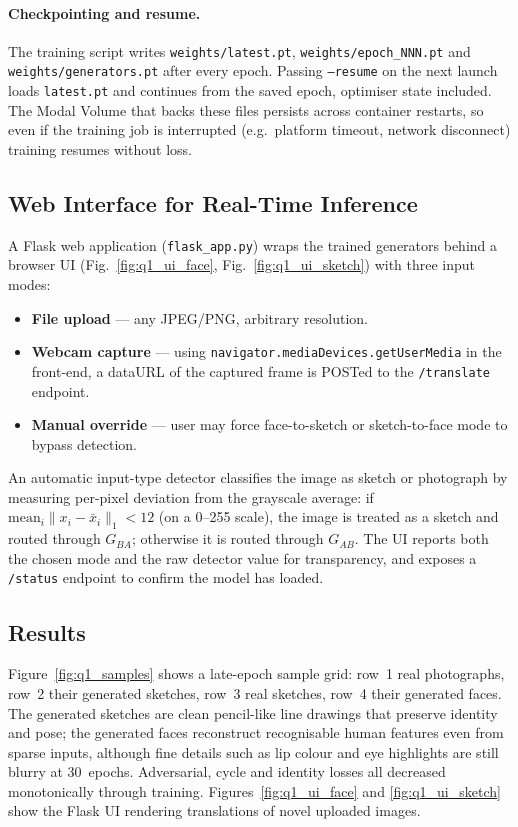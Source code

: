 \documentclass[runningheads]{llncs}
\begin{document}
\paragraph{Checkpointing and resume.} The training script writes
\texttt{weights/latest.pt}, \texttt{weights/epoch\_NNN.pt} and
\texttt{weights/generators.pt} after every epoch. Passing
\texttt{--resume} on the next launch loads \texttt{latest.pt} and
continues from the saved epoch, optimiser state included. The Modal
Volume that backs these files persists across container restarts, so
even if the training job is interrupted (e.g.\ platform timeout,
network disconnect) training resumes without loss.

\subsection{Web Interface for Real-Time Inference}

A Flask web application (\texttt{flask\_app.py}) wraps the trained
generators behind a browser UI (Fig.~\ref{fig:q1_ui_face},
Fig.~\ref{fig:q1_ui_sketch}) with three input modes:

\begin{itemize}
\item \textbf{File upload} --- any JPEG/PNG, arbitrary resolution.
\item \textbf{Webcam capture} --- using
\texttt{navigator.mediaDevices.getUserMedia} in the front-end, a
dataURL of the captured frame is POSTed to the \texttt{/translate}
endpoint.
\item \textbf{Manual override} --- user may force face-to-sketch or
sketch-to-face mode to bypass detection.
\end{itemize}

An automatic input-type detector classifies the image as sketch or
photograph by measuring per-pixel deviation from the grayscale average:
if $\mathrm{mean}_{i}\lVert x_i - \bar{x}_i \rVert_1 < 12$ (on a 0--255
scale), the image is treated as a sketch and routed through $G_{BA}$;
otherwise it is routed through $G_{AB}$. The UI reports both the
chosen mode and the raw detector value for transparency, and exposes a
\texttt{/status} endpoint to confirm the model has loaded.

\subsection{Results}

Figure~\ref{fig:q1_samples} shows a late-epoch sample grid: row~1 real
photographs, row~2 their generated sketches, row~3 real sketches, row~4
their generated faces. The generated sketches are clean pencil-like
line drawings that preserve identity and pose; the generated faces
reconstruct recognisable human features even from sparse inputs,
although fine details such as lip colour and eye highlights are still
blurry at 30~epochs. Adversarial, cycle and identity losses all decreased
monotonically through training. Figures~\ref{fig:q1_ui_face} and
\ref{fig:q1_ui_sketch} show the Flask UI rendering translations of
novel uploaded images.
\end{document}
